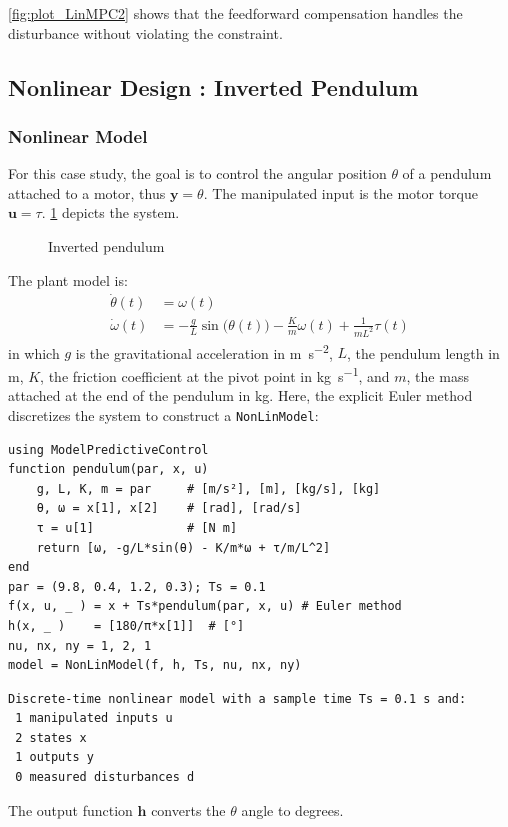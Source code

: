\cref{fig:plot_LinMPC2} shows that the feedforward compensation handles the disturbance without violating the constraint.

\subsection{Nonlinear Design : Inverted Pendulum}
\label{sec.nonlinear_design}

\subsubsection{Nonlinear Model}

For this case study, the goal is to control the angular position $\theta$ of a pendulum attached to a motor, thus $\mathbf{y} = \theta$. The manipulated input is the motor torque $\mathbf{u} = \tau$. \cref{fig:pendulum} depicts the system. 

\begin{figure}[h]
    \centering
    
    \caption{Inverted pendulum}
    \label{fig:pendulum}
\end{figure}

The plant model is:
\begin{subequations}
\begin{align}
\dot{\theta}(t) &= \omega(t) \\
\dot{\omega}(t) &= -\frac{g}{L}\sin\big(\theta(t)\big) -\frac{K}{m}\omega(t) + \frac{1}{m L^2}\tau(t) \label{eq.pendulum_speed}
\end{align}
\end{subequations}
in which $g$ is the gravitational acceleration in \si{\meter\per\second\squared}, $L$, the pendulum length in \si{\meter}, $K$, the friction coefficient at the pivot point in \si{\kilogram\per\second}, and $m$, the mass attached at the end of the pendulum in \si{\kilogram}. Here, the explicit Euler method discretizes the system to construct a \texttt{NonLinModel}:
\begin{verbatim}
using ModelPredictiveControl
function pendulum(par, x, u)
    g, L, K, m = par     # [m/s²], [m], [kg/s], [kg]
    θ, ω = x[1], x[2]    # [rad], [rad/s]
    τ = u[1]             # [N m]
    return [ω, -g/L*sin(θ) - K/m*ω + τ/m/L^2]
end
par = (9.8, 0.4, 1.2, 0.3); Ts = 0.1
f(x, u, _ ) = x + Ts*pendulum(par, x, u) # Euler method
h(x, _ )    = [180/π*x[1]]  # [°]
nu, nx, ny = 1, 2, 1
model = NonLinModel(f, h, Ts, nu, nx, ny)
\end{verbatim}
\spacerepl
\begin{verbatim}
Discrete-time nonlinear model with a sample time Ts = 0.1 s and:
 1 manipulated inputs u
 2 states x
 1 outputs y
 0 measured disturbances d
\end{verbatim}
The output function $\mathbf{h}$ converts the $\theta$ angle to degrees.

